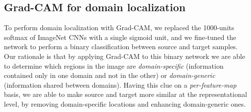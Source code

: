 \documentclass[../main.tex]{subfiles}
\begin{document}
    \subsection{Grad-CAM for domain localization}\label{subsec:gradcam-domainness}

    To perform domain localization with Grad-CAM, we replaced the 1000-units softmax of ImageNet CNNs with a single sigmoid
    unit, and we fine-tuned the network to perform a binary classification between source and target samples. Our rationale is
    that by applying Grad-CAM to this binary network we are able to determine which regions
    in the image are \textit{domain-specific} (information contained only in one domain and not in the other) or
    \textit{domain-generic} (information shared between domains). Having this clue on a \textit{per-feature-map} basis,
    we are able to make source and target more similar at the representational level, by removing domain-specific locations and
    enhancing domain-generic ones. \\
\end{document}
